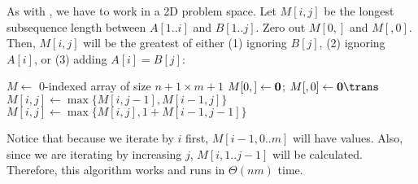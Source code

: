 As with , we have to work in a 2D problem space.
Let $M[i,j]$ be the longest subsequence length between $A[1..i]$ and $B[1..j]$.
Zero out $M[0,]$ and $M[,0]$.
Then, $M[i,j]$ will be the greatest of either 
(1) ignoring $B[j]$, (2) ignoring $A[i]$, or (3) adding $A[i] = B[j]$:

\begin{algorithm}
  \caption{}
  \begin{algorithmic}[1]
    \State $M \gets$ 0-indexed array of size $n+1 \times m+1$
    \State $M[0,] \gets \vb{0}$; $M[,0] \gets \vb{0}\trans$
    \State $M[i,j] \gets \max\{M[i,j-1], M[i-1,j]\}$
     \State $M[i,j] \gets \max\{M[i,j], 1 + M[i-1,j-1]\}$ \EndIf
    \EndFor\EndFor
    \State {}
  \end{algorithmic}
\end{algorithm}

Notice that because we iterate by $i$ first, $M[i-1,0..m]$ will have values.
Also, since we are iterating by increasing $j$, $M[i,1..j-1]$ will be calculated.
Therefore, this algorithm works and runs in $\Theta(nm)$ time.

